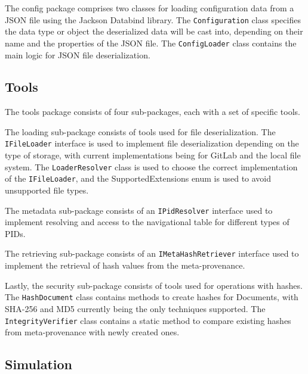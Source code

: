 \documentclass[
  digital,     %
  oneside,     %
  nosansbold,  %
  nocolorbold, %
  lof,         %
  lot,         %
]{fithesis4}
\begin{document}
The config package comprises two classes for loading configuration data from a JSON file using the Jackson Databind library. The \texttt{Configuration} class specifies the data type or object the deserialized data will be cast into, depending on their name and the properties of the JSON file. The \texttt{ConfigLoader} class contains the main logic for JSON file deserialization.

\subsection{Tools}
\vskip 0.35cm

The tools package consists of four sub-packages, each with a set of specific tools. 

The loading sub-package consists of tools used for file deserialization. The \texttt{IFileLoader} interface is used to implement file deserialization depending on the type of storage, with current implementations being for GitLab and the local file system. The \texttt{LoaderResolver} class is used to choose the correct implementation of the \texttt{IFileLoader}, and the SupportedExtensions enum is used to avoid unsupported file types. 

The metadata sub-package consists of an \texttt{IPidResolver} interface used to implement resolving and access to the navigational table for different types of PIDs. 

The retrieving sub-package consists of an \texttt{IMetaHashRetriever} interface used to implement the retrieval of hash values from the meta-provenance. 

Lastly, the security sub-package consists of tools used for operations with hashes. The \texttt{HashDocument} class contains methods to create hashes for Documents, with SHA-256 and MD5 currently being the only techniques supported. The \texttt{IntegrityVerifier} class contains a static method to compare existing hashes from meta-provenance with newly created ones.

\subsection{Simulation}
\vskip 0.35cm
\end{document}
